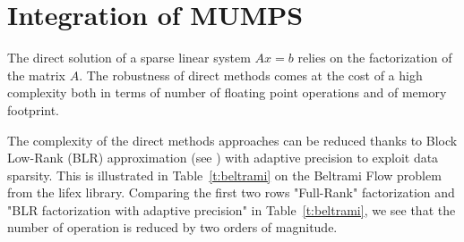 \documentclass[a4paper,12pt]{article}
\begin{document}
\newpage

\section{{Integration of MUMPS}}
\label{sec:section6}


The direct solution of a sparse linear system $Ax=b$ relies on the factorization of the matrix $A$.
The robustness of direct methods comes at the cost of a high complexity both in terms
of number of floating point operations and of memory footprint.


The complexity of the direct methods approaches can be reduced thanks to Block
Low-Rank (BLR) approximation (see \cite{ablm:17b,aabblw:15}) with adaptive precision \cite{abbg:23} to exploit data sparsity.
This is illustrated in Table~\ref{t:beltrami} on the Beltrami Flow problem from the lifex library. Comparing the first two rows "Full-Rank" factorization and "BLR factorization with adaptive precision" in Table~\ref{t:beltrami}, we see that the number of operation is reduced by two orders of magnitude.
\end{document}
